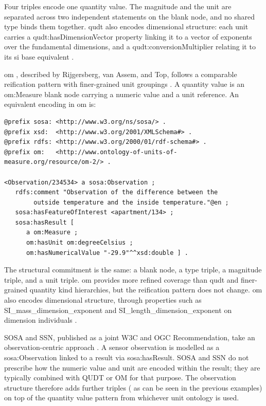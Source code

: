 Four triples encode one quantity value. 
The magnitude and the unit are separated across two independent statements on the blank node, and no shared type binds them together. \ac{qudt} also encodes dimensional structure: each unit carries a \textsf{qudt:hasDimensionVector} property linking it to a vector of exponents over the fundamental dimensions, and a \textsf{qudt:conversionMultiplier} relating it to its \ac{si} base equivalent \cite{hodgson2014quantities}.

\ac{om} , described by Rijgersberg, van Assem, and Top, follows a comparable reification pattern with finer-grained unit groupings \cite{vanassem2013ontology}. 
A quantity value is an \textsf{om:Measure} blank node carrying a numeric value and a unit reference. 
An equivalent encoding in \ac{om} is:

\begin{verbatim}
@prefix sosa: <http://www.w3.org/ns/sosa/> .
@prefix xsd:  <http://www.w3.org/2001/XMLSchema#> .
@prefix rdfs: <http://www.w3.org/2000/01/rdf-schema#> .
@prefix om:   <http://www.ontology-of-units-of-measure.org/resource/om-2/> .

<Observation/234534> a sosa:Observation ;
   rdfs:comment "Observation of the difference between the 
        outside temperature and the inside temperature."@en ;
   sosa:hasFeatureOfInterest <apartment/134> ;
   sosa:hasResult [
      a om:Measure ;
      om:hasUnit om:degreeCelsius ;
      om:hasNumericalValue "-29.9"^^xsd:double ] .
\end{verbatim}

The structural commitment is the same: a blank node, a type triple, a magnitude triple, and a unit triple. 
\ac{om} provides more refined coverage than \ac{qudt} and finer-grained quantity kind hierarchies, but the reification pattern does not change. 
\ac{om} also encodes dimensional structure, through properties such as \textsf{SI\_mass\_dimension\_exponent} and \textsf{SI\_length\_dimension\_exponent} on dimension individuals \cite{vanassem2013ontology}.

SOSA and SSN, published as a joint W3C and OGC Recommendation, take an observation-centric approach \cite{haller2019sosa}. A sensor observation is modelled as a sosa:Observation linked to a result via sosa:hasResult. SOSA and SSN do not prescribe how the numeric value and unit are encoded within the result; they are typically combined with QUDT or OM for that purpose. The observation structure therefore adds further triples ( as can be seen in the previous examples) on top of the quantity value pattern from whichever unit ontology is used.

